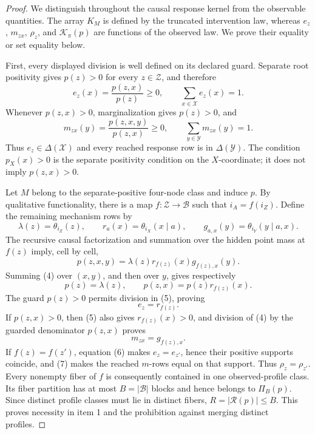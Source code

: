 \documentclass{article}
\begin{document}
\begin{proof}
We distinguish throughout the causal response kernel from the observable
quantities.  The array \(K_M\) is defined by the truncated intervention
law, whereas \(e_z\), \(m_{zx}\), \(\rho_z\), and
\(\mathcal K_\pi(p)\) are functions of the observed law.  We prove their
equality or set equality below.

First, every displayed division is well defined on its declared guard.
Separate root positivity gives \(p(z)>0\) for every
\(z\in\mathcal Z\), and therefore
\[
 e_z(x)=\frac{p(z,x)}{p(z)}\geq 0,
 \qquad
 \sum_{x\in\mathcal X}e_z(x)=1.
 \tag{1}
\]
Whenever \(p(z,x)>0\), marginalization gives \(p(z)>0\), and
\[
 m_{zx}(y)=\frac{p(z,x,y)}{p(z,x)}\geq0,
 \qquad
 \sum_{y\in\mathcal Y}m_{zx}(y)=1.
 \tag{2}
\]
Thus \(e_z\in\Delta(\mathcal X)\) and every reached response row is in
\(\Delta(\mathcal Y)\).  The condition \(p_X(x)>0\) is the separate
positivity condition on the \(X\)-coordinate; it does not imply
\(p(z,x)>0\).

Let \(M\) belong to the separate-positive four-node class and induce
\(p\).  By qualitative functionality, there is a map
\(f:\mathcal Z\to\mathcal B\) such that \(i_A=f(i_Z)\).  Define the
remaining mechanism rows by
\[
 \lambda(z)=\theta_{i_Z}(z),\qquad
 r_a(x)=\theta_{i_X}(x\mid a),\qquad
 g_{a,x}(y)=\theta_{i_Y}(y\mid a,x).
 \tag{3}
\]
The recursive causal factorization and summation over the hidden point
mass at \(f(z)\) imply, cell by cell,
\[
 p(z,x,y)=\lambda(z)r_{f(z)}(x)g_{f(z),x}(y).
 \tag{4}
\]
Summing (4) over \((x,y)\), and then over \(y\), gives respectively
\[
 p(z)=\lambda(z),
 \qquad
 p(z,x)=p(z)r_{f(z)}(x).
 \tag{5}
\]
The guard \(p(z)>0\) permits division in (5), proving
\[
 e_z=r_{f(z)}.
 \tag{6}
\]
If \(p(z,x)>0\), then (5) also gives \(r_{f(z)}(x)>0\), and division of
(4) by the guarded denominator \(p(z,x)\) proves
\[
 m_{zx}=g_{f(z),x}.
 \tag{7}
\]
If \(f(z)=f(z')\), equation (6) makes \(e_z=e_{z'}\), hence their
positive supports coincide, and (7) makes the reached \(m\)-rows equal
on that support.  Thus \(\rho_z=\rho_{z'}\).  Every nonempty fiber of
\(f\) is consequently contained in one observed-profile class.  Its
fiber partition has at most \(B=|\mathcal B|\) blocks and hence belongs
to \(\Pi_B(p)\).  Since distinct profile classes must lie in distinct
fibers, \(R=|\mathcal R(p)|\leq B\).  This proves necessity in item 1
and the prohibition against merging distinct profiles.


\end{proof}
\end{document}

